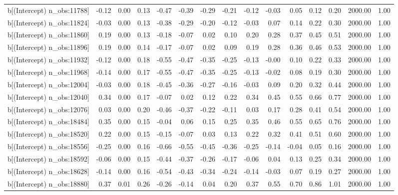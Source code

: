 \begin{table}[ht]
\begin{tabular}{rrrrrrrrrrrrrrr}
  b[(Intercept) n\_obs:11788] & -0.12 & 0.00 & 0.13 & -0.47 & -0.39 & -0.29 & -0.21 & -0.12 & -0.03 & 0.05 & 0.12 & 0.20 & 2000.00 & 1.00 \\ 
  b[(Intercept) n\_obs:11824] & -0.03 & 0.00 & 0.13 & -0.38 & -0.29 & -0.20 & -0.12 & -0.03 & 0.07 & 0.14 & 0.22 & 0.30 & 2000.00 & 1.00 \\ 
  b[(Intercept) n\_obs:11860] & 0.19 & 0.00 & 0.13 & -0.18 & -0.07 & 0.02 & 0.10 & 0.20 & 0.28 & 0.37 & 0.45 & 0.51 & 2000.00 & 1.00 \\ 
  b[(Intercept) n\_obs:11896] & 0.19 & 0.00 & 0.14 & -0.17 & -0.07 & 0.02 & 0.09 & 0.19 & 0.28 & 0.36 & 0.46 & 0.53 & 2000.00 & 1.00 \\ 
  b[(Intercept) n\_obs:11932] & -0.12 & 0.00 & 0.18 & -0.55 & -0.47 & -0.35 & -0.25 & -0.13 & -0.00 & 0.10 & 0.22 & 0.33 & 2000.00 & 1.00 \\ 
  b[(Intercept) n\_obs:11968] & -0.14 & 0.00 & 0.17 & -0.55 & -0.47 & -0.35 & -0.25 & -0.13 & -0.02 & 0.08 & 0.19 & 0.30 & 2000.00 & 1.00 \\ 
  b[(Intercept) n\_obs:12004] & -0.03 & 0.00 & 0.18 & -0.45 & -0.36 & -0.27 & -0.16 & -0.03 & 0.09 & 0.20 & 0.32 & 0.44 & 2000.00 & 1.00 \\ 
  b[(Intercept) n\_obs:12040] & 0.34 & 0.00 & 0.17 & -0.07 & 0.02 & 0.12 & 0.22 & 0.34 & 0.45 & 0.55 & 0.66 & 0.77 & 2000.00 & 1.00 \\ 
  b[(Intercept) n\_obs:12076] & 0.03 & 0.00 & 0.20 & -0.46 & -0.37 & -0.22 & -0.11 & 0.03 & 0.17 & 0.28 & 0.41 & 0.54 & 2000.00 & 1.00 \\ 
  b[(Intercept) n\_obs:18484] & 0.35 & 0.00 & 0.15 & -0.04 & 0.06 & 0.15 & 0.25 & 0.35 & 0.46 & 0.55 & 0.65 & 0.76 & 2000.00 & 1.00 \\ 
  b[(Intercept) n\_obs:18520] & 0.22 & 0.00 & 0.15 & -0.15 & -0.07 & 0.03 & 0.13 & 0.22 & 0.32 & 0.41 & 0.51 & 0.60 & 2000.00 & 1.00 \\ 
  b[(Intercept) n\_obs:18556] & -0.25 & 0.00 & 0.16 & -0.66 & -0.55 & -0.45 & -0.36 & -0.25 & -0.14 & -0.04 & 0.05 & 0.16 & 2000.00 & 1.00 \\ 
  b[(Intercept) n\_obs:18592] & -0.06 & 0.00 & 0.15 & -0.44 & -0.37 & -0.26 & -0.17 & -0.06 & 0.04 & 0.13 & 0.25 & 0.34 & 2000.00 & 1.00 \\ 
  b[(Intercept) n\_obs:18628] & -0.14 & 0.00 & 0.16 & -0.54 & -0.43 & -0.34 & -0.24 & -0.14 & -0.03 & 0.07 & 0.19 & 0.27 & 2000.00 & 1.00 \\ 
  b[(Intercept) n\_obs:18880] & 0.37 & 0.01 & 0.26 & -0.26 & -0.14 & 0.04 & 0.20 & 0.37 & 0.55 & 0.70 & 0.86 & 1.01 & 2000.00 & 1.00 \\ 

\end{tabular}
\end{table}
